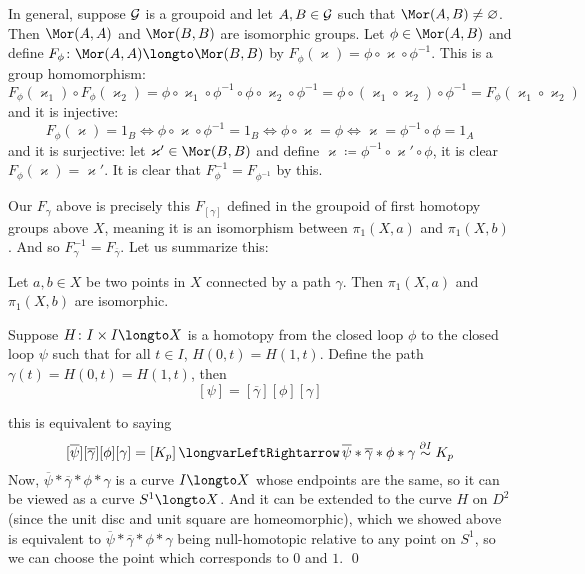 In general, suppose ${\cal G}$ is a groupoid and let $A,B\in{\cal G}$ such that $\Mor(A,B)\neq\varnothing$.
Then $\Mor(A,A)$ and $\Mor(B,B)$ are isomorphic groups.
Let $\phi\in\Mor(A,B)$ and define $F_\phi\colon\Mor(A,A)\longto\Mor(B,B)$ by $F_\phi(\varkappa)=\phi\circ\varkappa\circ\phi^{-1}$.
This is a group homomorphism:
$$ F_\phi(\varkappa_1)\circ F_\phi(\varkappa_2) = \phi\circ\varkappa_1\circ\phi^{-1}\circ\phi\circ\varkappa_2\circ\phi^{-1} = \phi\circ(\varkappa_1\circ\varkappa_2)\circ\phi^{-1} = F_\phi(\varkappa_1\circ\varkappa_2) $$
and it is injective:
$$ F_\phi(\varkappa) = 1_B \iff \phi\circ\varkappa\circ\phi^{-1} = 1_B \iff \phi\circ\varkappa=\phi \iff \varkappa = \phi^{-1}\circ\phi = 1_A $$
and it is surjective: let $\varkappa'\in\Mor(B,B)$ and define $\varkappa\coloneqq\phi^{-1}\circ\varkappa'\circ\phi$, it is clear $F_\phi(\varkappa)=\varkappa'$.
It is clear that $F_\phi^{-1}=F_{\phi^{-1}}$ by this.

Our $F_\gamma$ above is precisely this $F_{[\gamma]}$ defined in the groupoid of first homotopy groups above $X$, meaning it is an isomorphism between $\pi_1(X,a)$ and $\pi_1(X,b)$.
And so $F_\gamma^{-1}=F_{\overline\gamma}$.
Let us summarize this:

\bprop

    Let $a,b\in X$ be two points in $X$ connected by a path $\gamma$.
    Then $\pi_1(X,a)$ and $\pi_1(X,b)$ are isomorphic.

\eprop

\bprop

    Suppose $H\colon I\times I\longto X$ is a homotopy from the closed loop $\phi$ to the closed loop $\psi$ such that for all $t\in I$, $H(0,t)=H(1,t)$.
    Define the path $\gamma(t)=H(0,t)=H(1,t)$, then
    $$ [\psi] = [\overline\gamma][\phi][\gamma] $$

\eprop

\Proof this is equivalent to saying
$$ [\overline\psi][\overline\gamma][\phi][\gamma] = [K_p] \iff \overline\psi*\overline\gamma*\phi*\gamma \hdi K_p $$
Now, $\overline\psi*\overline\gamma*\phi*\gamma$ is a curve $I\longto X$ whose endpoints are the same, so it can be viewed as a curve $S^1\longto X$.
And it can be extended to the curve $H$ on $D^2$ (since the unit disc and unit square are homeomorphic), which we showed above is equivalent to $\overline\psi*\overline\gamma*\phi*\gamma$ being
null-homotopic relative to any point on $S^1$, so we can choose the point which corresponds to $0$ and $1$.
\qed

\bthrm

